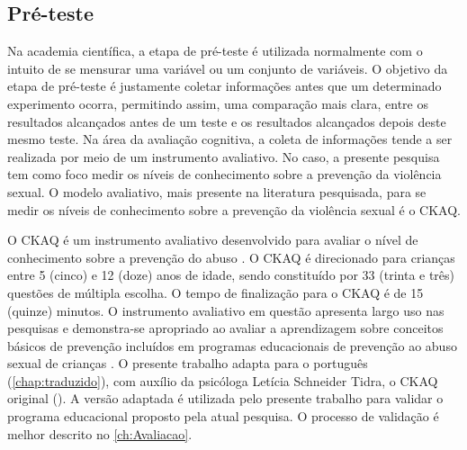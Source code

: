 \subsection{Pré-teste}\label{subsec:preteste}

Na academia científica, a etapa de pré-teste é utilizada normalmente com o intuito de se mensurar uma variável ou um conjunto de variáveis. O objetivo da etapa de pré-teste é justamente coletar informações antes que um determinado experimento ocorra, permitindo assim, uma comparação mais clara, entre os resultados alcançados antes de um teste e os resultados alcançados depois deste mesmo teste. Na área da avaliação cognitiva, a coleta de informações tende a ser realizada por meio de um instrumento avaliativo. No caso, a presente pesquisa tem como foco medir os níveis de conhecimento sobre a prevenção da violência sexual. O modelo avaliativo, mais presente na literatura pesquisada, para se medir os níveis de conhecimento sobre a prevenção da violência sexual é o \acf{CKAQ}.

O \ac{CKAQ} é um instrumento avaliativo desenvolvido para avaliar o nível de conhecimento sobre a prevenção do abuso \cite{tutty1992ability}. O \ac{CKAQ} é direcionado para crianças entre 5 (cinco) e 12 (doze) anos de idade, sendo constituído por 33 (trinta e três) questões de múltipla escolha. O tempo de finalização para o \ac{CKAQ} é de 15 (quinze) minutos. O instrumento avaliativo em questão apresenta largo uso nas pesquisas e demonstra-se apropriado ao avaliar a aprendizagem sobre conceitos básicos de prevenção incluídos em programas educacionais de prevenção ao abuso sexual de crianças \cite{tutty1992ability}. O presente trabalho adapta para o português (\autoref{chap:traduzido}), com auxílio da psicóloga Letícia Schneider Tidra, o \ac{CKAQ} original (). A versão adaptada é utilizada pelo presente trabalho para validar o programa educacional proposto pela atual pesquisa. O processo de validação é melhor descrito no \autoref{ch:Avaliacao}.



